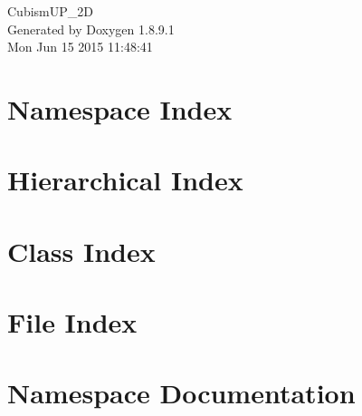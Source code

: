 \documentclass[twoside]{book}
\newcommand{\+}{\discretionary{\mbox{\scriptsize$\hookleftarrow$}}{}{}}
\newcommand{\clearemptydoublepage}{%
  \newpage{\pagestyle{empty}\cleardoublepage}%
}
\begin{document}
\hypersetup{pageanchor=false,
             bookmarks=true,
             bookmarksnumbered=true,
             pdfencoding=unicode
            }
\begin{titlepage}
\vspace*{7cm}
\begin{center}%
{\Large Cubism\+U\+P\+\_\+2\+D }\\
\vspace*{1cm}
{\large Generated by Doxygen 1.8.9.1}\\
\vspace*{0.5cm}
{\small Mon Jun 15 2015 11:48:41}\\
\end{center}
\end{titlepage}
\clearemptydoublepage
\tableofcontents
\clearemptydoublepage
{}
\hypersetup{pageanchor=true}

\chapter{Namespace Index}

\chapter{Hierarchical Index}

\chapter{Class Index}

\chapter{File Index}

\chapter{Namespace Documentation}

\end{document}
